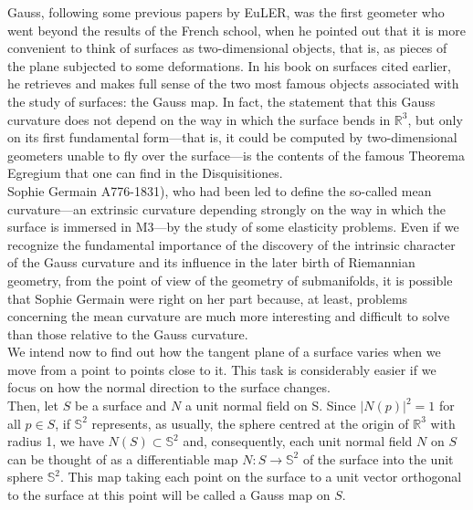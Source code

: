 Gauss, following some previous papers by EuLER, was the first geometer who went beyond the results of the French school, when he pointed out that it is more convenient to think of surfaces as two-dimensional objects, that is, as pieces of the plane subjected to some deformations. In his book on surfaces cited earlier, he retrieves and makes full sense of the two most famous objects associated with the study of surfaces: the Gauss map. In fact, the statement that this Gauss curvature does not depend on the way in which the surface bends in $\mathbb{R}^3$, but only on its first fundamental form—that is, it could be computed by two-dimensional geometers unable to fly over the surface—is the contents of the famous Theorema Egregium that one can find in the Disquisitiones.
${ }$\\

Sophie Germain A776-1831), who had been led to define the so-called mean curvature—an extrinsic curvature depending strongly on the way in which the surface is immersed in M3—by the study of some elasticity problems. Even if we recognize the fundamental importance of the discovery of the intrinsic character of the Gauss curvature and its influence in the later birth of Riemannian geometry, from the point of view of the geometry of submanifolds, it is possible that Sophie Germain were right on her part because, at least, problems concerning the mean curvature are much more interesting and difficult to solve than those relative to the Gauss curvature.
${ }$\\

We intend now to find out how the tangent plane of a surface varies when we move from a point to points close to it. This task is considerably easier if we focus on how the normal direction to the surface changes.
${ }$\\

Then, let $S$ be a surface and $N$ a unit normal field on S. Since $|N(p)|^2 = 1$ for all $p \in S$, if $\mathbb{S}^2$ represents, as usually, the sphere centred at the origin of $\mathbb{R}^3$ with radius 1, we have $N(S) \subset \mathbb{S}^2$ and, consequently, each unit normal field $N$ on $S$ can be thought of as a differentiable map $N : S \to \mathbb{S}^2$ of the surface into the unit sphere $\mathbb{S}^2$. This map taking each point on the surface to a unit vector orthogonal to the surface at this point will be called a Gauss map on $S$.
${ }$\\

